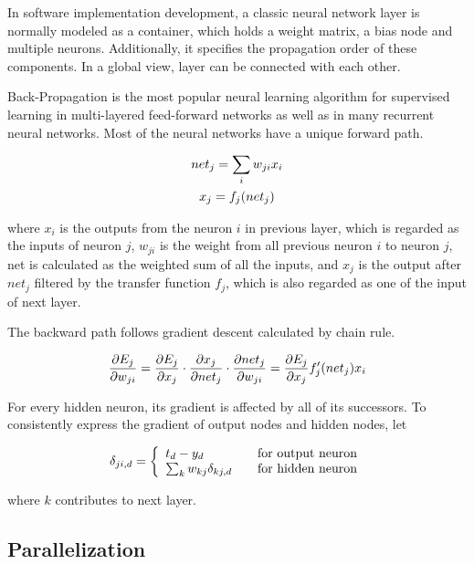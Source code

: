\documentclass[procedia]{easychair}
\begin{document}
In software implementation development, a classic neural network layer is normally modeled as a container, which holds a weight matrix, a bias node and multiple neurons.  Additionally, it specifies the propagation order of these components.  In a global view, layer can be connected with each other.

Back-Propagation is the most popular neural learning algorithm for supervised learning in multi-layered feed-forward networks as well as in many recurrent neural networks.  Most of the neural networks have a unique forward path.

\begin{gather}
    net_j = \sum_i w_{ji} x_i \notag \\
    x_j = f_j(net_j) \notag
\end{gather}

where $x_i$ is the outputs from the neuron $i$ in previous layer, which is regarded as the inputs of neuron $j$, $w_{ji}$ is the weight from all previous neuron $i$ to neuron $j$, net is calculated as the weighted sum of all the inputs, and $x_j$ is the output after $net_j$ filtered by the transfer function $f_j$, which is also regarded as one of the input of next layer.

The backward path follows gradient descent calculated by chain rule.

\begin{equation}
    \frac{ \partial E_j }{ \partial w_{ji} } = \frac{ \partial E_j }{ \partial x_j } \cdot \frac{ \partial x_j }{ \partial net_j } \cdot \frac{ \partial net_j }{ \partial w_{ji} } = \frac{ \partial E_j }{ \partial x_j } f'_j(net_j) x_i \notag
\end{equation}

For every hidden neuron, its gradient is affected by all of its successors.  To consistently express the gradient of output nodes and hidden nodes, let

\begin{equation}
    \delta_{ji,d} = \left \{
    \begin{array}{l l}
        t_d - y_d & \quad \text{for output neuron} \\
        \sum_k {w_{kj}\delta_{kj,d} } & \quad \text{for hidden neuron}
    \end{array} \right. \notag
\end{equation}

where $k$ contributes to next layer.

\subsection{Parallelization}
\end{document}
